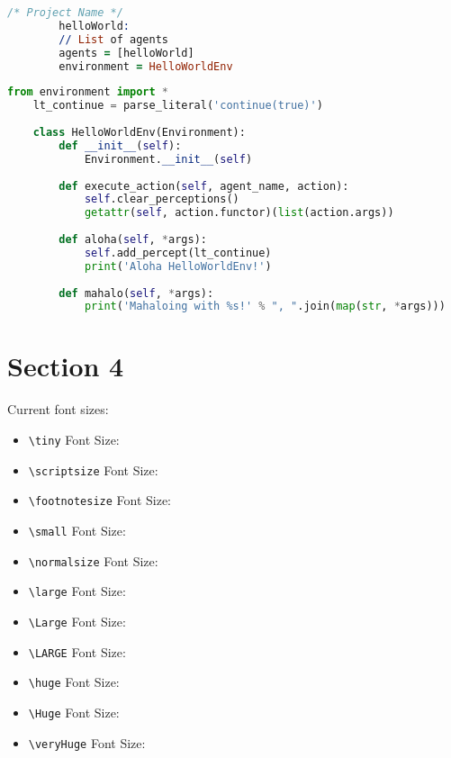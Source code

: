 \documentclass[a0,portrait]{lab-poster}
\begin{document}
\begin{multicols}{2}
\begin{minipage}{.235\textwidth}
	\begin{minipage}{\textwidth}
		\lstset{style=codeStyle}
		\begin{lstlisting}[language=Prolog, label={alg:exemplo-projeto-hello-world}, caption={AgentSpeak(Py) programme example.}]
		/* Project Name */
		helloWorld:
		// List of agents
		agents = [helloWorld]
		environment = HelloWorldEnv
		\end{lstlisting}
	\end{minipage}\hfill
\end{minipage}\hfill
\begin{minipage}{.235\textwidth}
	\lstset{style=codeStyle}
	\begin{lstlisting}[language=Python, label={alg:exemplo-environment}, caption={Environment description in Python.}]
	from environment import *
	lt_continue = parse_literal('continue(true)')
	
	class HelloWorldEnv(Environment):
		def __init__(self):
			Environment.__init__(self)
		
		def execute_action(self, agent_name, action):
			self.clear_perceptions()
			getattr(self, action.functor)(list(action.args))
		
		def aloha(self, *args):
			self.add_percept(lt_continue)
			print('Aloha HelloWorldEnv!')
		
		def mahalo(self, *args):
			print('Mahaloing with %s!' % ", ".join(map(str, *args)))
	\end{lstlisting}
\end{minipage}

\section*{\huge Section 4}
      
Current font sizes:
\begin{itemize}
	\item {\tiny \verb|\tiny| Font Size: \showfontsize}
	\item {\scriptsize \verb|\scriptsize| Font Size: \showfontsize}
	\item {\footnotesize \verb|\footnotesize| Font Size: \showfontsize}
	\item {\small \verb|\small| Font Size: \showfontsize}
	\item {\normalsize \verb|\normalsize| Font Size: \showfontsize}
	\item {\large \verb|\large| Font Size: \showfontsize}
	\item {\Large \verb|\Large| Font Size: \showfontsize}
	\item {\LARGE \verb|\LARGE| Font Size: \showfontsize}
	\item {\huge \verb|\huge| Font Size: \showfontsize}
	\item {\Huge \verb|\Huge| Font Size: \showfontsize}
	\item {\veryHuge \verb|\veryHuge| Font Size: \showfontsize}
\end{itemize}



\end{multicols}
\end{document}
